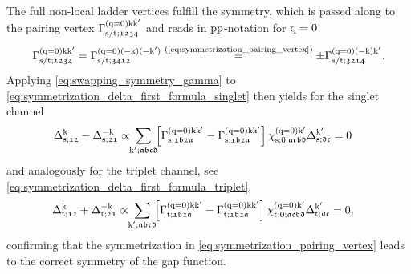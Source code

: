\documentclass[main.tex]{subfiles}
\begin{document}
The full non-local ladder vertices fulfill the  symmetry, which is passed along to the pairing vertex $\Gamma^{(\text{q}=0)\text{k}\text{k}'}_{\text{s}/\text{t};\mathfrak{1234}}$ and reads in $\text{pp}$-notation for $\text{q}=0$ \cite{ab initio dga}
\begin{align}\label{eq:swapping_symmetry_gamma}
	\Gamma^{(\text{q}=0)\text{k}\text{k}'}_{\text{s}/\text{t};\mathfrak{1234}}=\Gamma^{(\text{q}=0)(-\text{k})(-\text{k}')}_{\text{s}/\text{t};\mathfrak{3412}}\overset{\text{(\ref{eq:symmetrization_pairing_vertex})}}{=}\pm \Gamma^{(\text{q}=0)(-\text{k})\text{k}'}_{\text{s}/\text{t};\mathfrak{3214}}.
\end{align}
Applying \eqref{eq:swapping_symmetry_gamma} to \eqref{eq:symmetrization_delta_first_formula_singlet} then yields for the singlet channel
\begin{align}
	\Delta_{\text{s};\mathfrak{12}}^{\text{k}}-\Delta_{\text{s};\mathfrak{21}}^{-\text{k}}&\propto\!\!\sum_{\text{k}';\mathfrak{abcd}}\!\! \left [\Gamma^{(\text{q}=0)\text{k}\text{k}'}_{\text{s};\mathfrak{1b2a}}-\Gamma^{(\text{q}=0)\text{k}\text{k}'}_{\text{s};\mathfrak{1b2a}}\right ]\chi^{(\text{q}=0)\text{k}'}_{\text{s};0;\mathfrak{acbd}}\Delta_{\text{s};\mathfrak{dc}}^{\text{k}'}=0
\end{align}
and analogously for the triplet channel, see \eqref{eq:symmetrization_delta_first_formula_triplet},
\begin{align}
	\Delta_{\text{t};\mathfrak{12}}^{\text{k}}+\Delta_{\text{t};\mathfrak{21}}^{-\text{k}}&\propto\!\!\sum_{\text{k}';\mathfrak{abcd}}\!\! \left [\Gamma^{(\text{q}=0)\text{k}\text{k}'}_{\text{t};\mathfrak{1b2a}}-\Gamma^{(\text{q}=0)\text{k}\text{k}'}_{\text{t};\mathfrak{1b2a}}\right ]\chi^{(\text{q}=0)\text{k}'}_{\text{t};0;\mathfrak{acbd}}\Delta_{\text{t};\mathfrak{dc}}^{\text{k}'}=0,
\end{align}
confirming that the symmetrization in \eqref{eq:symmetrization_pairing_vertex} leads to the correct symmetry of the gap function.
\end{document}
